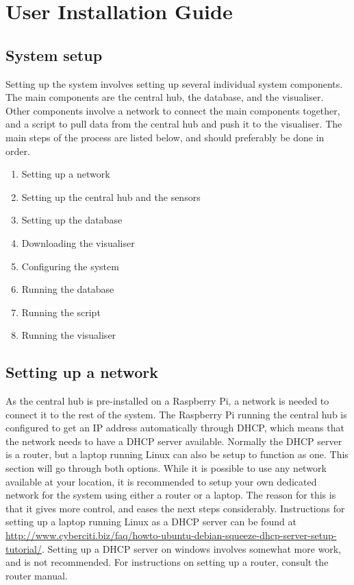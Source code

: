 \documentclass[../document.tex]{subfiles}
\begin{document}
\section{User Installation Guide}

\subsection{System setup}
Setting up the system involves setting up several individual system components. The main components are the central hub, the database, and the visualiser. Other components involve a network to connect the main components together, and a script to pull data from the central hub and push it to the visualiser. The main steps of the process are listed below, and should preferably be done in order.
\begin{enumerate}
\item Setting up a network

\item Setting up the central hub and the sensors

\item Setting up the database

\item Downloading the visualiser

\item Configuring the system

\item Running the database
\item Running the script
\item Running the visualiser
\end{enumerate}



\subsection{Setting up a network}
As the central hub is pre-installed on a \gls{Raspberry Pi}, a network is needed to connect it to the rest of the system. The \gls{Raspberry Pi} running the central hub is configured to get an IP address automatically through \gls{DHCP}, which means that the network needs to have a \gls{DHCP} server available. Normally the \gls{DHCP} server is a router, but a laptop running Linux can also be setup to function as one. This section will go through both options. While it is possible to use any network available at your location, it is recommended to setup your own dedicated network for the system using either a router or a laptop. The reason for this is that it gives more control, and eases the next steps considerably. Instructions for setting up a laptop running Linux as a \gls{DHCP} server can be found at \url{http://www.cyberciti.biz/faq/howto-ubuntu-debian-squeeze-dhcp-server-setup-tutorial/}. Setting up a \gls{DHCP} server on windows involves somewhat more work, and is not recommended. For instructions on setting up a router, consult the router manual.
\end{document}
